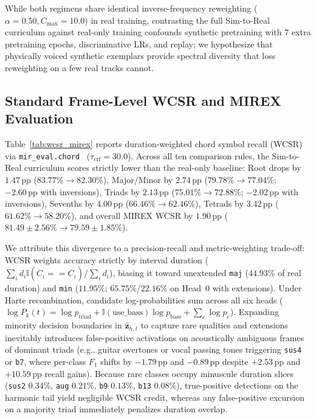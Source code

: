 While both regimens share identical inverse-frequency reweighting ($\alpha=0.50, C_{\max}=10.0$) in real training, contrasting the full Sim-to-Real curriculum against real-only training confounds synthetic pretraining with $7$ extra pretraining epochs, discriminative LRs, and replay; we hypothesize that physically voiced synthetic exemplars provide spectral diversity that loss reweighting on a few real tracks cannot.



\subsection{Standard Frame-Level WCSR and MIREX Evaluation}\label{subsec:wcsr_mirex}

Table~\ref{tab:wcsr_mirex} reports duration-weighted chord symbol recall (WCSR) via \texttt{mir\_eval.chord}~\cite{raffel2014mireval} ($\tau_{\text{crf}} = 30.0$). Across all ten comparison rules, the Sim-to-Real curriculum scores strictly lower than the real-only baseline: Root drops by $1.47\,\text{pp}$ ($83.77\% \!\to\! 82.30\%$), Major/Minor by $2.74\,\text{pp}$ ($79.78\% \!\to\! 77.04\%$; $-2.60\,\text{pp}$ with inversions), Triads by $2.13\,\text{pp}$ ($75.01\% \!\to\! 72.88\%$; $-2.02\,\text{pp}$ with inversions), Sevenths by $4.00\,\text{pp}$ ($66.46\% \!\to\! 62.46\%$), Tetrads by $3.42\,\text{pp}$ ($61.62\% \!\to\! 58.20\%$), and overall MIREX WCSR by $1.90\,\text{pp}$ ($81.49 \pm 2.56\% \!\to\! 79.59 \pm 1.85\%$).

We attribute this divergence to a precision-recall and metric-weighting trade-off: WCSR weights accuracy strictly by interval duration ($\sum_i d_i \mathbb{I}(\hat{C}_i == C_i) / \sum_i d_i$), biasing it toward unextended {\small\texttt{maj}} ($44.93\%$ of real duration) and {\small\texttt{min}} ($11.95\%$; $65.75\%$/$22.16\%$ on Head~0 with extensions). Under Harte recombination, candidate log-probabilities sum across all six heads ($\log P_k(t) = \log p_{\text{triad}} + \mathbb{I}(\text{use\_bass})\log p_{\text{bass}} + \sum_e \log p_e$). Expanding minority decision boundaries in $\hat{\mathbf{z}}_{h,t}$ to capture rare qualities and extensions inevitably introduces false-positive activations on acoustically ambiguous frames of dominant triads (e.g., guitar overtones or vocal passing tones triggering {\small\texttt{sus4}} or {\small\texttt{b7}}, where per-class $F_1$ shifts by $-1.79\,\text{pp}$ and $-0.89\,\text{pp}$ despite $+2.53\,\text{pp}$ and $+10.59\,\text{pp}$ recall gains). Because rare classes occupy minuscule duration slices ({\small\texttt{sus2}} $0.34\%$, {\small\texttt{aug}} $0.21\%$, {\small\texttt{b9}} $0.13\%$, {\small\texttt{b13}} $0.08\%$), true-positive detections on the harmonic tail yield negligible WCSR credit, whereas any false-positive excursion on a majority triad immediately penalizes duration overlap.

